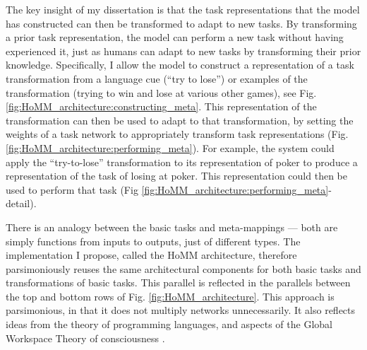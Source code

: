 \documentclass[12pt]{article}
\begin{document}
The key insight of my dissertation is that the task representations that the model has constructed can then be transformed to adapt to new tasks. By transforming a prior task representation, the model can perform a new task without having experienced it, just as humans can adapt to new tasks by transforming their prior knowledge. Specifically, I allow the model to construct a representation of a task transformation from a language cue (``try to lose'') or examples of the transformation (trying to win and lose at various other games), see Fig. \ref{fig:HoMM_architecture:constructing_meta}. This representation of the transformation can then be used to adapt to that transformation, by setting the weights of a task network to appropriately transform task representations (Fig. \ref{fig:HoMM_architecture:performing_meta}). For example, the system could apply the ``try-to-lose'' transformation to its representation of poker to produce a representation of the task of losing at poker. This representation could then be used to perform that task (Fig \ref{fig:HoMM_architecture:performing_meta}-detail). 

There is an analogy between the basic tasks and meta-mappings --- both are simply functions from inputs to outputs, just of different types. The implementation I propose, called the HoMM architecture, therefore parsimoniously reuses the same architectural components for both basic tasks and transformations of basic tasks. This parallel is reflected in the parallels between the top and bottom rows of Fig. \ref{fig:HoMM_architecture}. This approach is parsimonious, in that it does not multiply networks unnecessarily. It also reflects ideas from the theory of programming languages, and aspects of the Global Workspace Theory of consciousness \citep{Baars2005}. 
\end{document}
